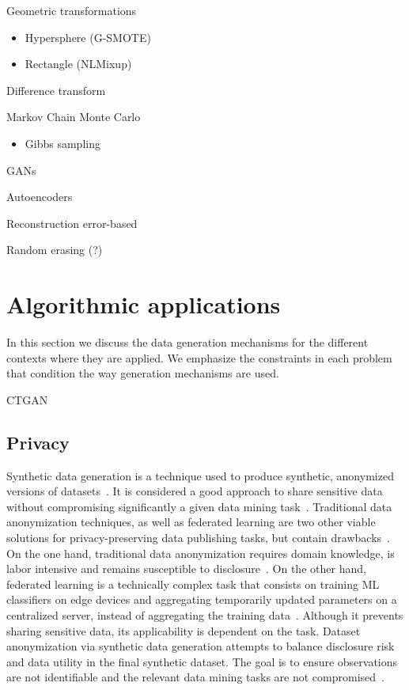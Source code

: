 \documentclass[parskip=full]{scrartcl}
\begin{document}
Geometric transformations
\begin{itemize}
    \item Hypersphere (G-SMOTE)
    \item Rectangle (NLMixup)
\end{itemize}

Difference transform~\cite{cheung2020modals}

Markov Chain Monte Carlo
\begin{itemize}
    \item Gibbs sampling
\end{itemize}

GANs

Autoencoders

Reconstruction error-based

Random erasing (?)


\section{Algorithmic applications}\label{sec:algorithmic-applications}

In this section we discuss the data generation mechanisms for the different
contexts where they are applied. We emphasize the constraints in each problem
that condition the way generation mechanisms are used.

CTGAN~\cite{xu2019modeling}

\subsection{Privacy}\label{sec:data-privacy}

Synthetic data generation is a technique used to produce synthetic, anonymized
versions of datasets~\cite{dankar2021fake}. It is considered a good approach
to share sensitive data without compromising significantly a given data mining
task~\cite{taub2018differential, park2018data}. Traditional data anonymization
techniques, as well as federated learning are two other viable solutions for
privacy-preserving data publishing tasks, but contain
drawbacks~\cite{hernandez2022synthetic}. On the one hand, traditional data
anonymization requires domain knowledge, is labor intensive and remains
susceptible to disclosure~\cite{reiter2004new}. On the other hand, federated
learning is a technically complex task that consists on training ML
classifiers on edge devices and aggregating temporarily updated parameters on
a centralized server, instead of aggregating the training
data~\cite{yu2022survey}. Although it prevents sharing sensitive data, its
applicability is dependent on the task. Dataset anonymization via synthetic
data generation attempts to balance disclosure risk and data utility in the
final synthetic dataset. The goal is to ensure observations are not
identifiable and the relevant data mining tasks are not
compromised~\cite{singh2017aggregating, li2018privacy}.
\end{document}
